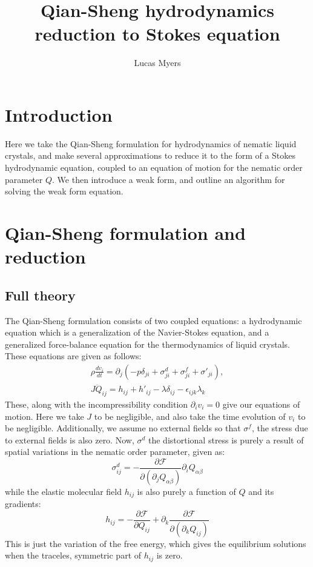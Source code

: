 \documentclass[reqno]{article}
\begin{document}
	\title{Qian-Sheng hydrodynamics reduction to Stokes equation}
	\author{Lucas Myers}
	\maketitle
	
	\section{Introduction}
  Here we take the Qian-Sheng formulation for hydrodynamics of nematic liquid
  crystals, and make several approximations to reduce it to the form of a Stokes
  hydrodynamic equation, coupled to an equation of motion for the nematic order
  parameter $Q$.
  We then introduce a weak form, and outline an algorithm for solving the weak
  form equation.

  \section{Qian-Sheng formulation and reduction}
  \subsection{Full theory}
  The Qian-Sheng formulation consists of two coupled equations: a hydrodynamic
  equation which is a generalization of the Navier-Stokes equation, and a
  generalized force-balance equation for the thermodynamics of liquid crystals.
  These equations are given as follows:
  \begin{equation}
  \begin{split}
    \rho \frac{d v_i}{dt}
    = \partial_j \left( -p \delta_{ji} + \sigma^d_{ji} + \sigma^f_{ji} + \sigma'_{ji} \right), \\
    J \ddot{Q}_{ij}
    = h_{ij} + h'_{ij} - \lambda \delta_{ij} - \epsilon_{ijk} \lambda_k
  \end{split}
  \end{equation}
  These, along with the incompressibility condition $\partial_i v_i = 0$ give
  our equations of motion.
	Here we take $J$ to be negligible, and also take the time evolution of $v_i$
  to be negligible.
  Additionally, we assume no external fields so that $\sigma^f$, the stress due
  to external fields is also zero.
  Now, $\sigma^d$ the distortional stress is purely a result of spatial
  variations in the nematic order parameter, given as:
  \begin{equation}
    \sigma^d_{ij} =
    - \frac{\partial \mathcal{F}}{\partial (\partial_j Q_{\alpha \beta})}
    \partial_i Q_{\alpha \beta}
  \end{equation}
  while the elastic molecular field $h_{ij}$ is also purely a function of $Q$
  and its gradients:
  \begin{equation}
    h_{ij}
    = - \frac{\partial \mathcal{F}}{\partial Q_{ij}}
    + \partial_k \frac{\partial \mathcal{F}}{\partial (\partial_k Q_{ij})}
  \end{equation}
	This is just the variation of the free energy, which gives the equilibrium
  solutions when the traceles, symmetric part of $h_{ij}$ is zero.
\end{document}
